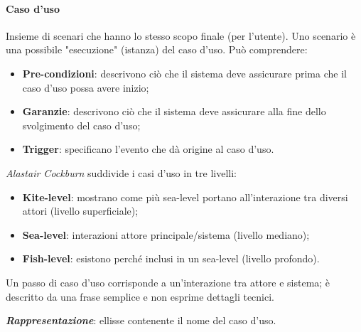\paragraph{Caso d'uso} Insieme di scenari che hanno lo stesso scopo finale (per l'utente). Uno scenario è una possibile "esecuzione" (istanza) del caso d'uso. Può comprendere:
\begin{itemize}
    \item \textbf{Pre-condizioni}: descrivono ciò che il sistema deve assicurare prima che il caso d'uso possa avere inizio;
    \item \textbf{Garanzie}: descrivono ciò che il sistema deve assicurare alla fine dello svolgimento del caso d'uso;
    \item \textbf{Trigger}: specificano l'evento che dà origine al caso d'uso.
\end{itemize}
\textit{Alastair Cockburn} suddivide i casi d'uso in tre livelli:
\begin{itemize}
    \item \textbf{Kite-level}: mostrano come più sea-level portano all'interazione tra diversi attori (livello superficiale);
    \item \textbf{Sea-level}: interazioni attore principale/sistema (livello mediano);
    \item \textbf{Fish-level}: esistono perché inclusi in un sea-level (livello profondo).
\end{itemize}
Un passo di caso d'uso corrisponde a un'interazione tra attore e sistema; è descritto da una frase semplice e non esprime dettagli tecnici.

\textbf{\textit{Rappresentazione}}: ellisse contenente il nome del caso d'uso.

\begin{figure}[H]
  \centering
  \hfill
\end{figure}

